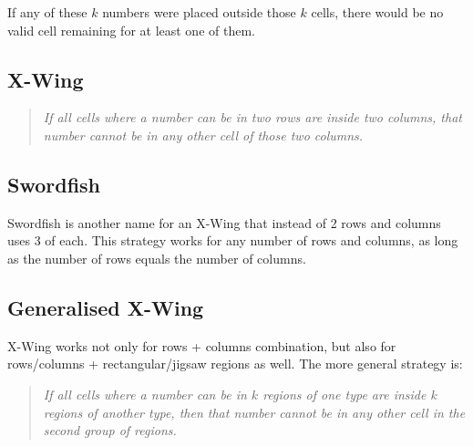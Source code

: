 If any of these $k$ numbers were placed outside those $k$ cells,
there would be no valid cell remaining for at least one of them.


\subsection*{X-Wing}

\begin{quote}
    \textit{
        If all cells where a number can be in two rows are inside two columns,
        that number cannot be in any other cell of those two columns.
    }
\end{quote}


\subsection*{Swordfish}

Swordfish is another name for an X-Wing that instead of 2 rows and columns uses 3 of each.
This strategy works for any number of rows and columns, as long as the number of rows equals the number of columns.


\subsection{Generalised X-Wing}

X-Wing works not only for rows + columns combination,
but also for rows/columns + rectangular/jigsaw regions as well.
The more general strategy is:

\begin{quote}
    \textit{
        If all cells where a number can be in $k$ regions of one type are inside $k$ regions of another type,
        then that number cannot be in any other cell in the second group of regions.
    }
\end{quote}


